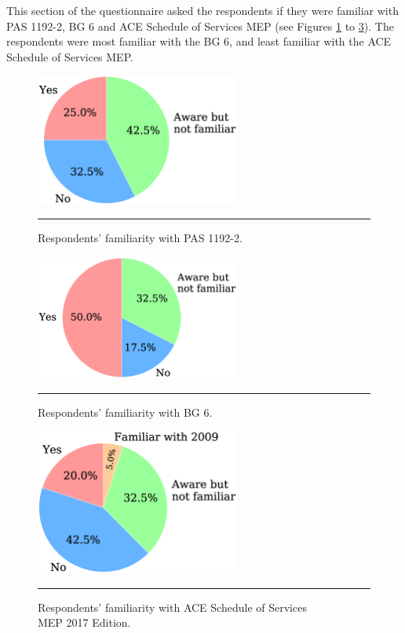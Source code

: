 This section of the questionnaire asked the respondents if they were familiar with PAS 1192-2, BG 6 and ACE Schedule of Services MEP (see Figures \ref{pas} to \ref{ace}).
The respondents were most familiar with the BG 6, and least familiar with the ACE Schedule of Services MEP.

\begin{figure}[htbp]
	\centering
	\includegraphics[width=0.6\textwidth]{figures/PAS_1192-2.eps}
	\rule{0.8\textwidth}{0.5pt} %
	\caption{Respondents' familiarity with PAS 1192-2.}
	\label{pas}
\end{figure}


\begin{figure}[htbp]
	\centering
	\includegraphics[width=0.6\textwidth]{figures/BG6.eps}
	\rule{0.8\textwidth}{0.5pt} %
	\caption{Respondents' familiarity with BG 6.}
	\label{bg6}
\end{figure}


\begin{figure}[htbp]
	\centering
	\includegraphics[width=0.6\textwidth]{figures/ACE.eps}
	\rule{0.8\textwidth}{0.5pt} %
	\caption{Respondents' familiarity with ACE Schedule of Services \\ MEP 2017 Edition.}
	\label{ace}
\end{figure}

